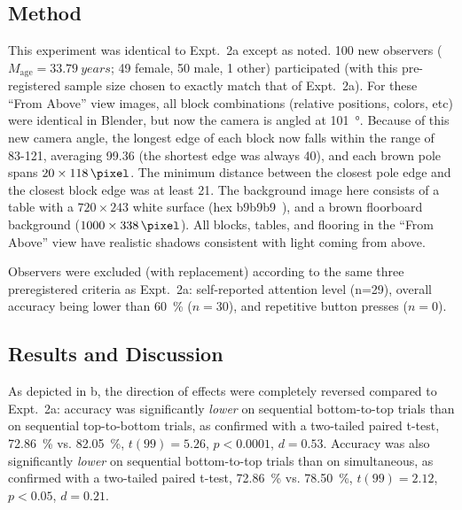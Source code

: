 \subsection{Method}
This experiment was identical to Expt.~2a except as noted.  100 new observers ($M_\text{age}=\qty{33.79}{years}$; 49 female, 50 male, 1 other) participated (with this pre-registered sample size chosen to exactly match that of Expt.~2a).  For these “From Above” view images, all block combinations (relative positions, colors, etc) were identical in Blender, but now the camera is angled at \qty{101}{\degree}.  Because of this new camera angle, the longest edge of each block now falls within the range of 83-\qty{121}{\pixel}, averaging \qty{99.36}{\pixel} (the shortest edge was always \qty{40}{\pixel}), and each brown pole spans $20 \times \qty{118}{\pixel}$.  The minimum distance between the closest pole edge and the closest block edge was at least \qty{21}{\pixel}.  The background image here consists of a table with a $720 \times 243$ white surface (hex b9b9b9~), and a brown floorboard background ($1000 \times \qty{338}{\pixel}$).  All blocks, tables, and flooring in the “From Above” view have realistic shadows consistent with light coming from above. 

Observers were excluded (with replacement) according to the same three preregistered criteria as Expt.~2a: self-reported attention level (n=29), overall accuracy being lower than \qty{60}{\percent} ($n=30$), and repetitive button presses ($n = 0$).

\subsection{Results and Discussion}
As depicted in b, the direction of effects were completely reversed compared to Expt.~2a: accuracy was significantly \textit{lower} on sequential bottom-to-top trials than on sequential top-to-bottom trials, as confirmed with a two-tailed paired t-test, \qty{72.86}{\percent} vs. \qty{82.05}{\percent}, $t(99) = 5.26$, $p < 0.0001$, $d = 0.53$.  Accuracy was also significantly \textit{lower} on sequential bottom-to-top trials than on simultaneous, as confirmed with a two-tailed paired t-test, \qty{72.86}{\percent} vs. \qty{78.50}{\percent}, $t(99) = 2.12$, $p < 0.05$, $d = 0.21$.

